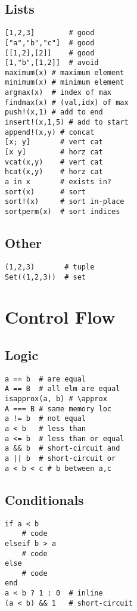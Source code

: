 \documentclass{article}
\begin{document}
\begin{multicols*}{3}
\subsection{Lists}
\vspace{-2mm}
\begin{verbatim}
[1,2,3]        # good
["a","b","c"]  # good
[[1,2],[2]]    # good
[1,"b",[1,2]]  # avoid 
maximum(x) # maximum element
minimum(x) # minimum element
argmax(x)  # index of max
findmax(x) # (val,idx) of max
push!(x,1) # add to end
insert!(x,1,5) # add to start
append!(x,y) # concat 
[x; y]       # vert cat
[x y]        # horz cat
vcat(x,y)    # vert cat
hcat(x,y)    # horz cat
a in x       # exists in?
sort(x)      # sort
sort!(x)     # sort in-place
sortperm(x)  # sort indices
\end{verbatim}


\subsection{Other}
\vspace{-2mm}
\begin{verbatim}
(1,2,3)       # tuple
Set((1,2,3))  # set
\end{verbatim}
    
\section{Control Flow}
\subsection{Logic}
\vspace*{-2mm}
\begin{verbatim}
a == b  # are equal
A == B  # all elm are equal
isapprox(a, b) # \approx
A === B # same memory loc
a != b  # not equal
a < b   # less than
a <= b  # less than or equal
a && b  # short-circuit and
a || b  # short-circuit or 
a < b < c # b between a,c
\end{verbatim}

\subsection{Conditionals}
\vspace*{-2mm}
\begin{verbatim}
if a < b
    # code
elseif b > a
    # code
else
    # code
end
a < b ? 1 : 0  # inline
(a < b) && 1   # short-circuit
\end{verbatim}


\end{multicols*}
\end{document}
